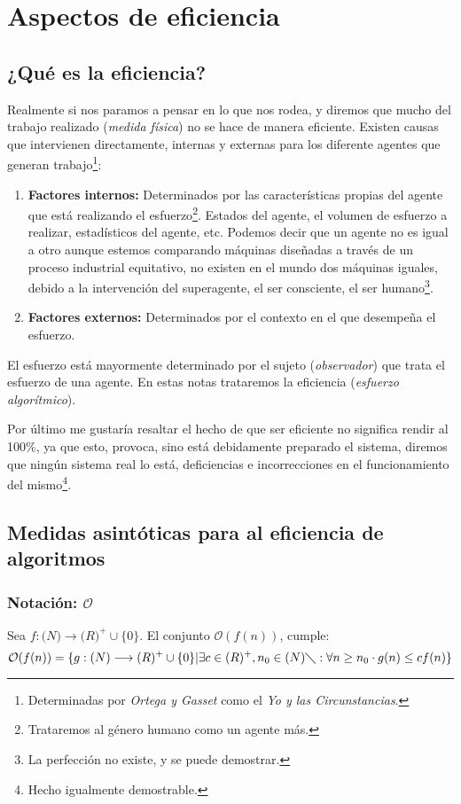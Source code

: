 
\section{Aspectos de eficiencia}
\subsection{¿Qué es la eficiencia?}

Realmente si nos paramos a pensar en lo que nos rodea, y diremos que mucho del trabajo realizado (\textit{medida física}) no se hace de manera eficiente. Existen causas que intervienen directamente, internas y externas para los diferente agentes que generan trabajo\footnote{Determinadas por \textit{Ortega y Gasset} como el \textit{Yo y las Circunstancias}.}:

\begin{enumerate}
\item \textbf{Factores internos:} Determinados por las características propias del agente que está realizando el esfuerzo\footnote{Trataremos al género humano como un agente más.}. Estados del agente, el volumen de esfuerzo a realizar, estadísticos del agente, etc. Podemos decir que un agente no es igual a otro aunque estemos comparando máquinas diseñadas a través de un proceso industrial equitativo, no existen en el mundo dos máquinas iguales, debido a la intervención del superagente, el ser consciente, el ser humano\footnote{La perfección no existe, y se puede demostrar.}.
\item \textbf{Factores externos:} Determinados por el contexto en el que desempeña el esfuerzo.
\end{enumerate}


El esfuerzo está mayormente determinado por el sujeto (\textit{observador}) que trata el esfuerzo de una agente. En estas notas trataremos la eficiencia (\textit{esfuerzo algorítmico}).


Por último me gustaría resaltar el hecho de que ser eficiente no significa rendir al 100\%, ya que esto, provoca, sino está debidamente preparado el sistema, diremos que ningún sistema real lo está, deficiencias e incorrecciones en el funcionamiento del mismo\footnote{Hecho igualmente demostrable.}.
\subsection{Medidas asintóticas para al eficiencia de algoritmos}

\subsubsection{Notación: $\mathcal{O}$}
 Sea $f: \mathbf(N) \longrightarrow \mathbf(R)^+ \cup \lbrace0\rbrace$. El conjunto $\mathcal{O}(f(n))$, cumple:
\begin{equation}
\mathcal{O}(f(n)) = \lbrace g:\mathbf(N) \longrightarrow \mathbf(R)^+ \cup \lbrace 0 \rbrace \vert \exists  c\in \mathbf(R)^+, n_0 \in \mathbf(N) \diagdown: \forall n \geq n_0 \cdot g(n) \leq cf(n)\rbrace
\end{equation}

